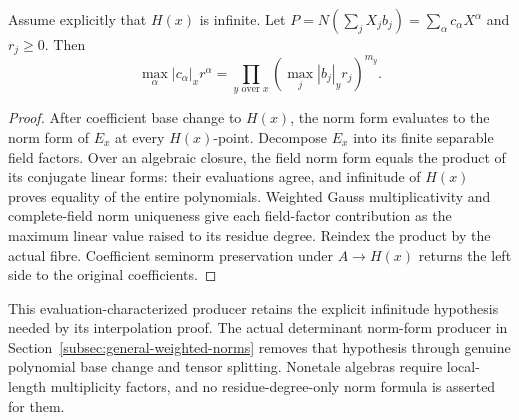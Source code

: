 \begin{theorem}
\label{spectrum:weighted-etale-norm}
\leanok
{}
Assume explicitly that $H(x)$ is infinite. Let
$P=N(\sum_j X_jb_j)=\sum_\alpha c_\alpha X^\alpha$ and $r_j\ge0$.
Then
\[
 \max_\alpha |c_\alpha|_x r^\alpha
 =\prod_{y\text{ over }x}\left(\max_j |b_j|_y r_j\right)^{m_y}.
\]
\end{theorem}
\begin{proof}
After coefficient base change to $H(x)$, the norm form evaluates
to the norm form of $E_x$ at every $H(x)$-point. Decompose $E_x$
into its finite separable field factors. Over an algebraic closure,
the field norm form equals the product of its conjugate linear forms:
their evaluations agree, and infinitude of $H(x)$ proves equality
of the entire polynomials. Weighted Gauss multiplicativity and
complete-field norm uniqueness give each field-factor contribution
as the maximum linear value raised to its residue degree. Reindex
the product by the actual fibre. Coefficient seminorm preservation
under $A\to H(x)$ returns the left side to the original coefficients.
\end{proof}

This evaluation-characterized producer retains the explicit infinitude
hypothesis needed by its interpolation proof. The actual determinant
norm-form producer in Section~\ref{subsec:general-weighted-norms} removes
that hypothesis through genuine polynomial base change and tensor splitting. Nonetale algebras require local-length multiplicity factors,
and no residue-degree-only norm formula is asserted for them.

